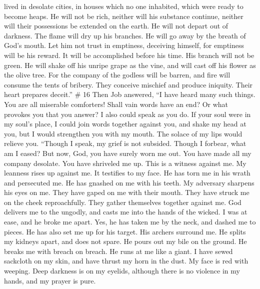 lived in desolate cities, in houses which no one inhabited, which were
ready to become heaps.  He will not be rich, neither will
his substance continue, neither will their possessions be extended on
the earth.  He will not depart out of darkness. The flame
will dry up his branches. He will go away by the breath of God's mouth.
 Let him not trust in emptiness, deceiving himself, for
emptiness will be his reward.  It will be accomplished
before his time. His branch will not be green.  He will
shake off his unripe grape as the vine, and will cast off his flower as
the olive tree.  For the company of the godless will be
barren, and fire will consume the tents of bribery.  They
conceive mischief and produce iniquity. Their heart prepares deceit.''
\# 16  Then Job answered,  ``I have heard
many such things. You are all miserable comforters!  Shall
vain words have an end? Or what provokes you that you answer?
 I also could speak as you do. If your soul were in my
soul's place, I could join words together against you, and shake my head
at you,  but I would strengthen you with my mouth. The
solace of my lips would relieve you.  ``Though I speak, my
grief is not subsided. Though I forbear, what am I eased? 
But now, God, you have surely worn me out. You have made all my company
desolate.  You have shriveled me up. This is a witness
against me. My leanness rises up against me. It testifies to my face.
 He has torn me in his wrath and persecuted me. He has
gnashed on me with his teeth. My adversary sharpens his eyes on me.
 They have gaped on me with their mouth. They have struck
me on the cheek reproachfully. They gather themselves together against
me.  God delivers me to the ungodly, and casts me into
the hands of the wicked.  I was at ease, and he broke me
apart. Yes, he has taken me by the neck, and dashed me to pieces. He has
also set me up for his target.  His archers surround me.
He splits my kidneys apart, and does not spare. He pours out my bile on
the ground.  He breaks me with breach on breach. He runs
at me like a giant.  I have sewed sackcloth on my skin,
and have thrust my horn in the dust.  My face is red with
weeping. Deep darkness is on my eyelids,  although there
is no violence in my hands, and my prayer is pure. 
